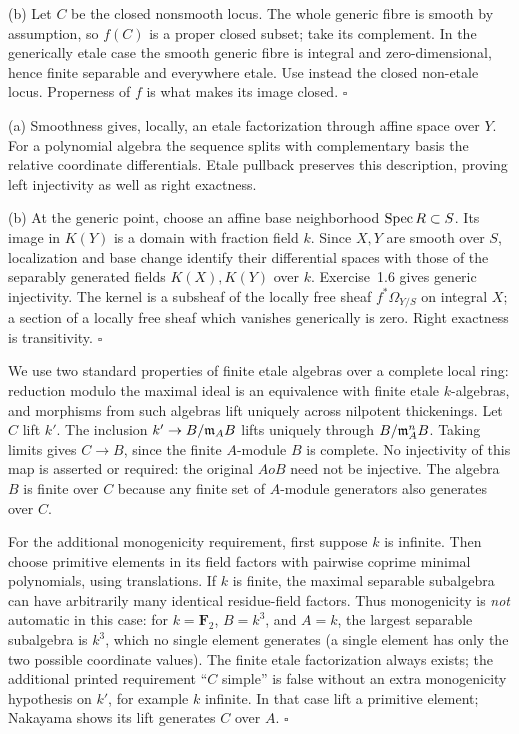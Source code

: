 \documentclass[11pt]{article}
\let\chapterexercise\exercise
\renewcommand{\exercise}[2]{\Needspace{8\baselineskip}\chapterexercise{#1}{#2}}
\begin{document}
(b) Let $C$ be the closed nonsmooth locus. The whole generic fibre is smooth by assumption, so $f(C)$ is a proper closed subset; take its complement. In the generically etale case the smooth generic fibre is integral and zero-dimensional, hence finite separable and everywhere etale. Use instead the closed non-etale locus. Properness of $f$ is what makes its image closed. \hfill$\square$

\pf
(a) Smoothness gives, locally, an etale factorization through affine space over $Y$. For a polynomial algebra the sequence splits with complementary basis the relative coordinate differentials. Etale pullback preserves this description, proving left injectivity as well as right exactness.

(b) At the generic point, choose an affine base neighborhood $\operatorname{Spec} R\subset S$. Its image in $K(Y)$ is a domain with fraction field $k$. Since $X,Y$ are smooth over $S$, localization and base change identify their differential spaces with those of the separably generated fields $K(X),K(Y)$ over $k$. Exercise~1.6 gives generic injectivity. The kernel is a subsheaf of the locally free sheaf $f^*\Omega_{Y/S}$ on integral $X$; a section of a locally free sheaf which vanishes generically is zero. Right exactness is transitivity. \hfill$\square$

\pf
We use two standard properties of finite etale algebras over a complete local ring: reduction modulo the maximal ideal is an equivalence with finite etale $k$-algebras, and morphisms from such algebras lift uniquely across nilpotent thickenings. Let $C$ lift $k'$. The inclusion $k'\to B/\mathfrak m_AB$ lifts uniquely through $B/\mathfrak m_A^nB$. Taking limits gives $C\to B$, since the finite $A$-module $B$ is complete. No injectivity of this map is asserted or required: the original $A	o B$ need not be injective. The algebra $B$ is finite over $C$ because any finite set of $A$-module generators also generates over $C$.

For the additional monogenicity requirement, first suppose $k$ is infinite. Then choose primitive elements in its field factors with pairwise coprime minimal polynomials, using translations. If $k$ is finite, the maximal separable subalgebra can have arbitrarily many identical residue-field factors. Thus monogenicity is \emph{not} automatic in this case: for $k=\mathbf F_2$, $B=k^3$, and $A=k$, the largest separable subalgebra is $k^3$, which no single element generates (a single element has only the two possible coordinate values). The finite etale factorization always exists; the additional printed requirement ``$C$ simple'' is false without an extra monogenicity hypothesis on $k'$, for example $k$ infinite. In that case lift a primitive element; Nakayama shows its lift generates $C$ over $A$. \hfill$\square$
\end{document}
